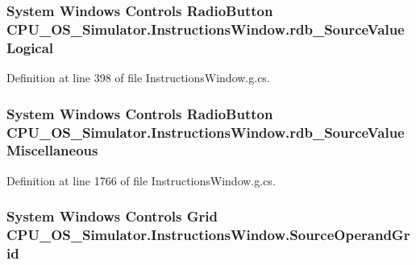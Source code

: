 \subsubsection[{rdb\+\_\+\+Source\+Value\+Logical}]{\setlength{\rightskip}{0pt plus 5cm}System Windows Controls Radio\+Button C\+P\+U\+\_\+\+O\+S\+\_\+\+Simulator.\+Instructions\+Window.\+rdb\+\_\+\+Source\+Value\+Logical\hspace{0.3cm}{\ttfamily [package]}}\label{class_c_p_u___o_s___simulator_1_1_instructions_window_ad0e882b0d6d067460309ae6f1dda5d56}


Definition at line 398 of file Instructions\+Window.\+g.\+cs.

\hypertarget{class_c_p_u___o_s___simulator_1_1_instructions_window_ae6e33f7879251b63282f5d3eaa693507}{}
\subsubsection[{rdb\+\_\+\+Source\+Value\+Miscellaneous}]{\setlength{\rightskip}{0pt plus 5cm}System Windows Controls Radio\+Button C\+P\+U\+\_\+\+O\+S\+\_\+\+Simulator.\+Instructions\+Window.\+rdb\+\_\+\+Source\+Value\+Miscellaneous\hspace{0.3cm}{\ttfamily [package]}}\label{class_c_p_u___o_s___simulator_1_1_instructions_window_ae6e33f7879251b63282f5d3eaa693507}


Definition at line 1766 of file Instructions\+Window.\+g.\+cs.

\hypertarget{class_c_p_u___o_s___simulator_1_1_instructions_window_a6e37ff7da499bab3f5b0037d2b4c68cd}{}
\subsubsection[{Source\+Operand\+Grid}]{\setlength{\rightskip}{0pt plus 5cm}System Windows Controls Grid C\+P\+U\+\_\+\+O\+S\+\_\+\+Simulator.\+Instructions\+Window.\+Source\+Operand\+Grid\hspace{0.3cm}{\ttfamily [package]}}\label{class_c_p_u___o_s___simulator_1_1_instructions_window_a6e37ff7da499bab3f5b0037d2b4c68cd}


